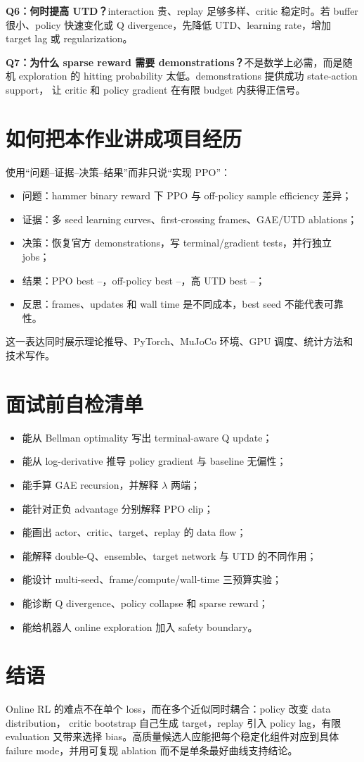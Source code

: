 \documentclass[10pt,twocolumn,a4paper]{ctexart}
\providecommand{\PPOBest}{--}
\providecommand{\OffBaseBest}{--}
\providecommand{\OffUTDBest}{--}
\begin{document}
\textbf{Q6：何时提高 UTD？}interaction 贵、replay 足够多样、critic 稳定时。若 buffer
很小、policy 快速变化或 Q divergence，先降低 UTD、learning rate，增加 target lag 或
regularization。

\textbf{Q7：为什么 sparse reward 需要 demonstrations？}不是数学上必需，而是随机
exploration 的 hitting probability 太低。demonstrations 提供成功 state-action support，
让 critic 和 policy gradient 在有限 budget 内获得正信号。

\section{如何把本作业讲成项目经历}
使用“问题--证据--决策--结果”而非只说“实现 PPO”：
\begin{itemize}
  \item 问题：hammer binary reward 下 PPO 与 off-policy sample efficiency 差异；
  \item 证据：多 seed learning curves、first-crossing frames、GAE/UTD ablations；
  \item 决策：恢复官方 demonstrations，写 terminal/gradient tests，并行独立 jobs；
  \item 结果：PPO best \PPOBest，off-policy best \OffBaseBest，高 UTD best
  \OffUTDBest；
  \item 反思：frames、updates 和 wall time 是不同成本，best seed 不能代表可靠性。
\end{itemize}
这一表达同时展示理论推导、PyTorch、MuJoCo 环境、GPU 调度、统计方法和技术写作。

\section{面试前自检清单}
\begin{itemize}
  \item 能从 Bellman optimality 写出 terminal-aware Q update；
  \item 能从 log-derivative 推导 policy gradient 与 baseline 无偏性；
  \item 能手算 GAE recursion，并解释 $\lambda$ 两端；
  \item 能针对正负 advantage 分别解释 PPO clip；
  \item 能画出 actor、critic、target、replay 的 data flow；
  \item 能解释 double-Q、ensemble、target network 与 UTD 的不同作用；
  \item 能设计 multi-seed、frame/compute/wall-time 三预算实验；
  \item 能诊断 Q divergence、policy collapse 和 sparse reward；
  \item 能给机器人 online exploration 加入 safety boundary。
\end{itemize}

\section{结语}
Online RL 的难点不在单个 loss，而在多个近似同时耦合：policy 改变 data distribution，
critic bootstrap 自己生成 target，replay 引入 policy lag，有限 evaluation 又带来选择
bias。高质量候选人应能把每个稳定化组件对应到具体 failure mode，并用可复现 ablation
而不是单条最好曲线支持结论。



\end{document}
